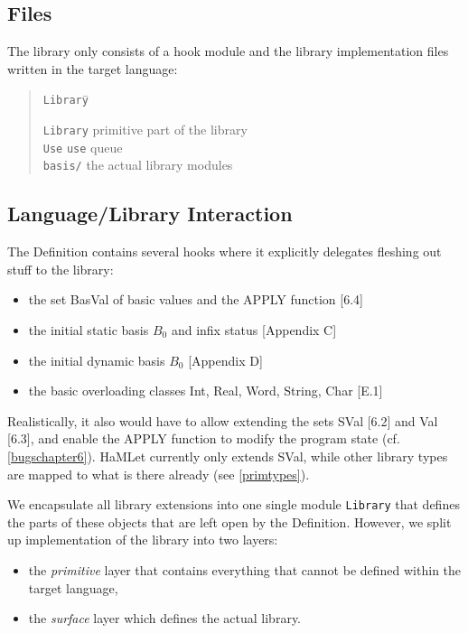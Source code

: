\documentclass[twoside,titlepage]{article}
\begin{document}
\subsection{Files}
\label{libfiles}

The library only consists of a hook module and the library implementation files written in the target language:

\begin{quote}
\begin{tabbing}
{\tt Library}\qquad\= \kill

{\tt Library}			\> primitive part of the library \\
{\tt Use}			\> {\tt use} queue \\
{\tt basis/}			\> the actual library modules\\
\end{tabbing}
\end{quote}


\subsection{Language/Library Interaction}
\label{libhooks}

The Definition contains several hooks where it explicitly delegates fleshing out stuff to the library:

\begin{itemize}
\item the set BasVal of basic values and the APPLY function [6.4]
\item the initial static basis $B_0$ and infix status [Appendix C]
\item the initial dynamic basis $B_0$ [Appendix D]
\item the basic overloading classes Int, Real, Word, String, Char [E.1]
\end{itemize}

Realistically, it also would have to allow extending the sets SVal [6.2] and Val [6.3], and enable the APPLY function to modify the program state (cf. \ref{bugschapter6}). HaMLet currently only extends SVal, while other library types are mapped to what is there already (see \ref{primtypes}).

We encapsulate all library extensions into one single module {\tt Library} that defines the parts of these objects that are left open by the Definition. However, we split up implementation of the library into two layers:

\begin{itemize}
\item the {\em primitive} layer that contains everything that cannot be defined within the target language,
\item the {\em surface} layer which defines the actual library.
\end{itemize}
\end{document}

